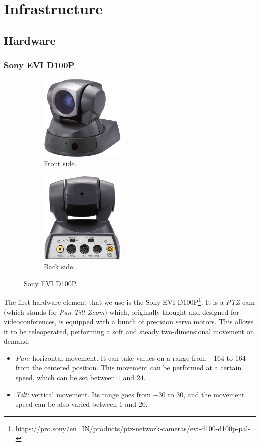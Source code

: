 \chapter{Infrastructure}

\section{Hardware}
	\subsection{Sony EVI D100P}
	\label{sec:3_ptz}
		\begin{figure}[h]
			\centering
			\begin{subfigure}[h]{0.4\linewidth}
				\centering
				\includegraphics[width=1.6in]{images/ptz_front}
				\caption{Front side.}
			\end{subfigure}
			\qquad
			\begin{subfigure}[h]{0.4\linewidth}
				\centering
				\includegraphics[width=1.6in]{images/ptz_back}
				\caption{Back side.}
			\end{subfigure}
			\caption{Sony EVI D100P.}
			\label{fig:3_evi}
		\end{figure} 
		
		The first hardware element that we use is the Sony EVI D100P\footnote{\url{https://pro.sony/en_IN/products/ptz-network-cameras/evi-d100-d100p-pal-}}. It is a \emph{PTZ} cam (which stands for \emph{Pan Tilt Zoom}) which, originally thought and designed for videoconferences, is equipped with a bunch of precision servo motors. This allows it to be teleoperated, performing a soft and steady two-dimensional movement on demand:
		\begin{itemize}
			\item \emph{Pan:} horizontal movement. It can take values on a range from $-164$ to $164$ from the centered position. This movement can be performed at a certain speed, which can be set between $1$ and $24$.

			\item \emph{Tilt:} vertical movement. Its range goes from $-30$ to $30$, and the movement speed can be also varied between $1$ and $20$.
		\end{itemize}

